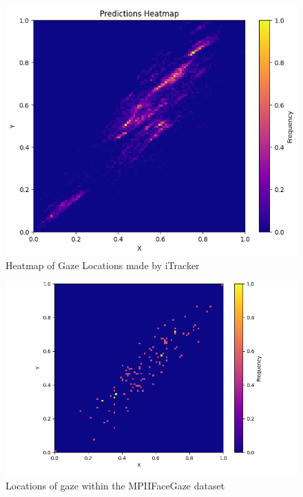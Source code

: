 \documentclass{report}
\begin{document}
\begin{figure}
    \centering
    \includegraphics[scale=1]{../assets/heatmap.png}
    \caption{Heatmap of Gaze Locations made by iTracker}
    \label{fig:heatmap}
\end{figure}

\begin{figure}
    \begin{center}
        \includegraphics[scale=0.5]{../assets/log-mpii.png}   
    \end{center}
    \caption{Locations of gaze within the MPIIFaceGaze dataset}
    \label{fig:log-mpii}
\end{figure}
\end{document}
